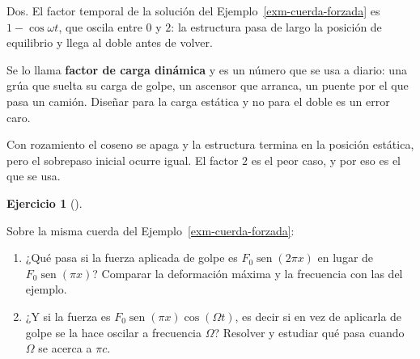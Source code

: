 \documentclass[
  spanish,
  a4paper,
]{scrbook}
\providecommand{\tightlist}{%
  \setlength{\itemsep}{0pt}\setlength{\parskip}{0pt}}
\theoremstyle{definition}
\theoremstyle{plain}
\theoremstyle{definition}
\theoremstyle{plain}
\theoremstyle{definition}
\newtheorem{exercise}{Ejercicio}[chapter]
\theoremstyle{remark}
\begin{document}
Dos. El factor temporal de la solución del
Ejemplo~\ref{exm-cuerda-forzada} es \(1-\cos\omega t\), que oscila entre
\(0\) y \(2\): la estructura pasa de largo la posición de equilibrio y
llega al doble antes de volver.

Se lo llama \textbf{factor de carga dinámica} y es un número que se usa
a diario: una grúa que suelta su carga de golpe, un ascensor que
arranca, un puente por el que pasa un camión. Diseñar para la carga
estática y no para el doble es un error caro.

Con rozamiento el coseno se apaga y la estructura termina en la posición
estática, pero el sobrepaso inicial ocurre igual. El factor \(2\) es el
peor caso, y por eso es el que se usa.

\begin{exercise}[]\protect\hypertarget{exr-cuerda-otra-fuerza}{}\label{exr-cuerda-otra-fuerza}

Sobre la misma cuerda del Ejemplo~\ref{exm-cuerda-forzada}:

\begin{enumerate}
\def\labelenumi{\alph{enumi}.}
\tightlist
\item
  ¿Qué pasa si la fuerza aplicada de golpe es
  \(F_0\operatorname{sen}(2\pi x)\) en lugar de
  \(F_0\operatorname{sen}(\pi x)\)? Comparar la deformación máxima y la
  frecuencia con las del ejemplo.
\item
  ¿Y si la fuerza es \(F_0\operatorname{sen}(\pi x)\cos(\Omega t)\), es
  decir si en vez de aplicarla de golpe se la hace oscilar a frecuencia
  \(\Omega\)? Resolver y estudiar qué pasa cuando \(\Omega\) se acerca a
  \(\pi c\).
\end{enumerate}

\end{exercise}
\end{document}
